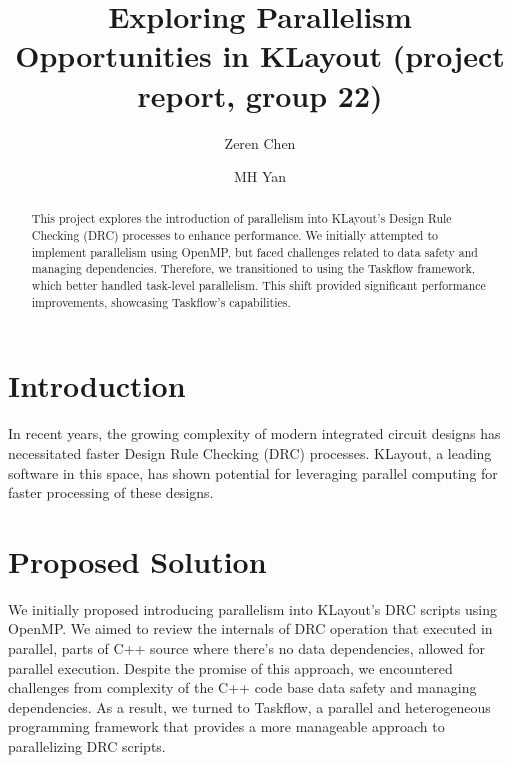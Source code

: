 \documentclass[sigconf]{acmart}
\begin{document}
\title{Exploring Parallelism Opportunities in KLayout (project report, group 22)}

\author{Zeren Chen}

\author{MH Yan }


\renewcommand{\shortauthors}{Zeren et al.}



  \begin{abstract}
  This project explores the introduction of parallelism into KLayout's Design Rule Checking (DRC) processes to enhance performance. We initially attempted to implement parallelism using OpenMP, but faced challenges related to data safety and managing dependencies. Therefore, we transitioned to using the Taskflow framework, which better handled task-level parallelism. This shift provided significant performance improvements, showcasing Taskflow's capabilities.
  \end{abstract}
  
  
  \maketitle
  
  \section{Introduction}
  In recent years, the growing complexity of modern integrated circuit designs has necessitated faster Design Rule Checking (DRC) processes. KLayout, a leading software in this space, has shown potential for leveraging parallel computing for faster processing of these designs.
  
  \section{Proposed Solution}
  We initially proposed introducing parallelism into KLayout's DRC scripts using OpenMP. We aimed to review the internals of DRC operation that executed in parallel, parts of C++ source where there's no data dependencies, allowed for parallel execution. Despite the promise of this approach, we encountered challenges from complexity of the C++ code base data safety and managing dependencies. As a result, we turned to Taskflow, a parallel and heterogeneous programming framework that provides a more manageable approach to parallelizing DRC scripts.
  
\end{document}
